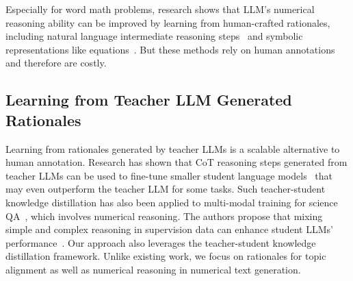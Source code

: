 Especially for word math problems, research shows that LLM's numerical reasoning ability can be improved by learning from human-crafted rationales, including natural language intermediate reasoning steps~\citep{ling_program_2017} and symbolic representations like equations~\citep{chiang_semantically-aligned_2019,amini_mathqa_2019}. 
But these methods rely on human annotations and therefore are costly. 

\subsection{Learning from Teacher LLM Generated Rationales}

Learning from rationales generated by teacher LLMs is a scalable alternative to human annotation. 
Research has shown that CoT reasoning steps generated from teacher LLMs can be used to fine-tune smaller student language models~\cite{ho_large_2023,hsieh_distilling_2023} that 
may even outperform the teacher LLM for some tasks.
Such teacher-student knowledge distillation has also been applied to multi-modal training for science QA~\cite{wang_t-sciq_2023}, which involves numerical reasoning.
The authors propose that mixing simple and complex reasoning in supervision data can enhance student LLMs' performance~\cite{wang_t-sciq_2023}. 
Our approach also leverages the teacher-student knowledge distillation framework. 
Unlike existing work, we focus on rationales for topic alignment as well as numerical reasoning in numerical text generation.

